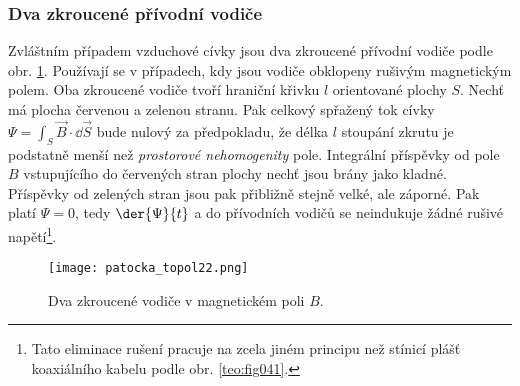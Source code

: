       \subsubsection{Dva zkroucené přívodní vodiče}
        Zvláštním případem vzduchové cívky jsou dva zkroucené přívodní vodiče podle obr. 
        \ref{es:fig_patocka_topol22}. Používají se v případech, kdy jsou vodiče obklopeny rušivým 
        magnetickým polem. Oba zkroucené vodiče tvoří hraniční křivku \(l\) orientované plochy 
        \(S\). Nechť má plocha červenou a zelenou stranu. Pak celkový spřažený tok cívky  \(\Psi = 
        \int_S\vec{B}\cdot \dd{\vec{S}}\) bude nulový za předpokladu, že délka \(l\) stoupání zkrutu je 
        podstatně menší než \emph{prostorové nehomogenity} pole. Integrální příspěvky od pole \(B\) 
        vstupujícího do červených stran plochy nechť jsou brány jako kladné. Příspěvky od zelených 
        stran jsou pak přibližně stejně velké, ale záporné. Pak platí \(\Psi = 0\), tedy 
        \(\der{\Psi}{t}\) a do přívodních vodičů se neindukuje žádné rušivé napětí\footnote{Tato 
        eliminace rušení pracuje na zcela jiném principu než stínicí plášť koaxiálního kabelu podle 
        obr. \ref{teo:fig041}.}.
        \begin{figure}[ht!]
          \centering  
          \texttt{[image: patocka\_topol22.png]}
          \caption{Dva zkroucené vodiče v magnetickém poli \(B\). \cite[s.~59]{Patocka4}} 
          \label{es:fig_patocka_topol22}
        \end{figure}
        
